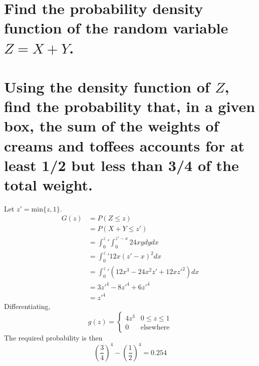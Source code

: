\documentclass[answers]{exam}
\begin{document}
\begin{questions}

\begin{parts}
	\part{Find the probability density function of the random variable $Z = X + Y$.}
	\part{Using the density function of $Z$, find the probability that, in a given box, the sum of the weights of creams and toffees accounts for at least 1/2 but less than 3/4 of the total weight.}
\end{parts}

\begin{solution}
	Let $z' = \text{min}\{z,1\}$.
	\begin{align*}
		G(z) &= P(Z \leq z) \\
		     &= P(X + Y \leq z') \\
		     &= \int_0^z' \int_0^{z'-x} 24xy dydx \\
		     &= \int_0^z' 12x(z'-x)^2 dx \\
		     &= \int_0^z' (12x^3 - 24x^2z' + 12xz'^2) dx \\
		     &= 3z'^4 - 8z'^4 + 6z'^4 \\
		     &= z'^4
	\end{align*}
	Differentiating,
	$$g(z) = \begin{cases} 4z^3 & 0 \leq z \leq 1 \\ 0 & \text{elsewhere} \end{cases}$$
	The required probability is then
	$$\left(\frac{3}{4}\right)^4 - \left(\frac{1}{2}\right)^4 = 0.254$$
\end{solution}



\end{questions}
\end{document}
